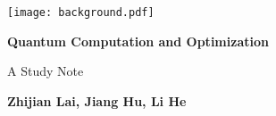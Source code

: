 \documentclass[
	11pt, %
	a4paper, %
]{LegrandOrangeBook}
\begin{document}

\titlepage %
	{\texttt{[image: background.pdf]}} %
	{ %
		\centering\sffamily %
		{\Huge\bfseries
            Quantum Computation and Optimization
            \par} %
		\vspace{16pt} %
		{\LARGE A Study Note\par} %
		\vspace{24pt} %
		{\huge\bfseries
            Zhijian Lai, 
            Jiang Hu, 
            Li He
            \par} %
	}







\end{document}
